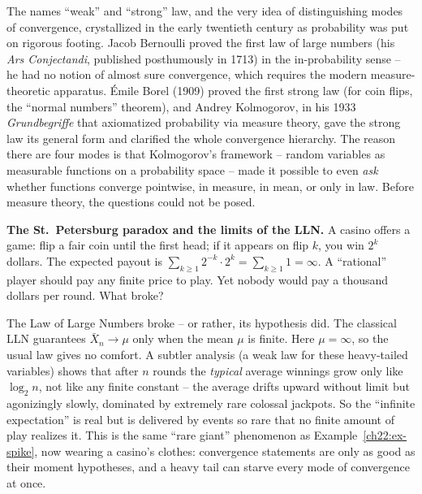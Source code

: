 \begin{historybox}
The names ``weak'' and ``strong'' law, and the very idea of distinguishing modes of
convergence, crystallized in the early twentieth century as probability was put on
rigorous footing. Jacob Bernoulli proved the first law of large numbers (his
\emph{Ars Conjectandi}, published posthumously in 1713) in the in-probability sense --
he had no notion of almost sure convergence, which requires the modern measure-theoretic
apparatus. \'Emile Borel (1909) proved the first strong law (for coin flips, the
``normal numbers'' theorem), and Andrey Kolmogorov, in his 1933 \emph{Grundbegriffe}
that axiomatized probability via measure theory, gave the strong law its general form
and clarified the whole convergence hierarchy. The reason there are four modes is that
Kolmogorov's framework -- random variables as measurable functions on a probability
space -- made it possible to even \emph{ask} whether functions converge pointwise,
in measure, in mean, or only in law. Before measure theory, the questions could not be
posed.
\end{historybox}

\begin{paradoxbox}
\textbf{The St.\ Petersburg paradox and the limits of the LLN.} A casino offers a game:
flip a fair coin until the first head; if it appears on flip $k$, you win $2^k$ dollars.
The expected payout is $\sum_{k\ge1} 2^{-k}\cdot 2^k = \sum_{k\ge1}1 = \infty$. A
``rational'' player should pay any finite price to play. Yet nobody would pay a thousand
dollars per round. What broke?

The Law of Large Numbers broke -- or rather, its hypothesis did. The classical LLN
guarantees $\bar X_n\to\mu$ only when the mean $\mu$ is finite. Here $\mu=\infty$, so
the usual law gives no comfort. A subtler analysis (a weak law for these heavy-tailed
variables) shows that after $n$ rounds the \emph{typical} average winnings grow only
like $\log_2 n$, not like any finite constant -- the average drifts upward without
limit but agonizingly slowly, dominated by extremely rare colossal jackpots. So the
``infinite expectation'' is real but is delivered by events so rare that no finite
amount of play realizes it. This is the same ``rare giant'' phenomenon as
Example~\ref{ch22:ex-spike}, now wearing a casino's clothes: convergence statements
are only as good as their moment hypotheses, and a heavy tail can starve every mode of
convergence at once.
\end{paradoxbox}

